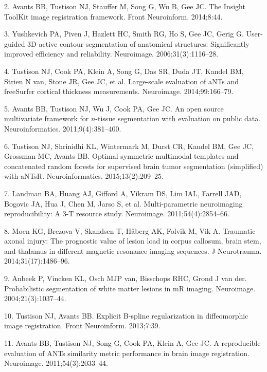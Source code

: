 \documentclass[12pt,]{article}
\begin{document}
\hypertarget{ref-Avants:2014aa}{}
2. Avants BB, Tustison NJ, Stauffer M, Song G, Wu B, Gee JC. The Insight
ToolKit image registration framework. Front Neuroinform. 2014;8:44.

\hypertarget{ref-Yushkevich:2006aa}{}
3. Yushkevich PA, Piven J, Hazlett HC, Smith RG, Ho S, Gee JC, Gerig G.
User-guided 3D active contour segmentation of anatomical structures:
Significantly improved efficiency and reliability. Neuroimage.
2006;31(3):1116--28.

\hypertarget{ref-Tustison:2014ab}{}
4. Tustison NJ, Cook PA, Klein A, Song G, Das SR, Duda JT, Kandel BM,
Strien N van, Stone JR, Gee JC, et al. Large-scale evaluation of aNTs
and freeSurfer cortical thickness measurements. Neuroimage.
2014;99:166--79.

\hypertarget{ref-Avants:2011aa}{}
5. Avants BB, Tustison NJ, Wu J, Cook PA, Gee JC. An open source
multivariate framework for \(n\)-tissue segmentation with evaluation on
public data. Neuroinformatics. 2011;9(4):381--400.

\hypertarget{ref-Tustison:2015aa}{}
6. Tustison NJ, Shrinidhi KL, Wintermark M, Durst CR, Kandel BM, Gee JC,
Grossman MC, Avants BB. Optimal symmetric multimodal templates and
concatenated random forests for supervised brain tumor segmentation
(simplified) with aNTsR. Neuroinformatics. 2015;13(2):209--25.

\hypertarget{ref-landman2011}{}
7. Landman BA, Huang AJ, Gifford A, Vikram DS, Lim IAL, Farrell JAD,
Bogovic JA, Hua J, Chen M, Jarso S, et al. Multi-parametric neuroimaging
reproducibility: A 3-T resource study. Neuroimage. 2011;54(4):2854--66.

\hypertarget{ref-Moen:2014aa}{}
8. Moen KG, Brezova V, Skandsen T, Håberg AK, Folvik M, Vik A. Traumatic
axonal injury: The prognostic value of lesion load in corpus callosum,
brain stem, and thalamus in different magnetic resonance imaging
sequences. J Neurotrauma. 2014;31(17):1486--96.

\hypertarget{ref-Anbeek:2004aa}{}
9. Anbeek P, Vincken KL, Osch MJP van, Bisschops RHC, Grond J van der.
Probabilistic segmentation of white matter lesions in mR imaging.
Neuroimage. 2004;21(3):1037--44.

\hypertarget{ref-Tustison:2013ac}{}
10. Tustison NJ, Avants BB. Explicit B-spline regularization in
diffeomorphic image registration. Front Neuroinform. 2013;7:39.

\hypertarget{ref-Avants:2011ab}{}
11. Avants BB, Tustison NJ, Song G, Cook PA, Klein A, Gee JC. A
reproducible evaluation of ANTs similarity metric performance in brain
image registration. Neuroimage. 2011;54(3):2033--44.
\end{document}
